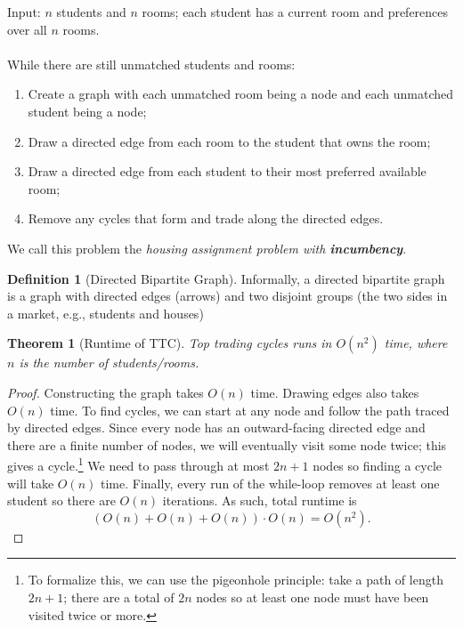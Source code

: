 \documentclass[dvipsnames]{article}
\newtheorem{theorem}{Theorem}[section]
\theoremstyle{definition}
\newtheorem{definition}{Definition}[section]
\theoremstyle{remark}
\newenvironment{mech}[1]{\begin{tcolorbox}[colback=red!5!white,colframe=red!75!black,title={#1}]}{\end{tcolorbox}}
\begin{document}
\begin{mech}{Top Trading Cycles}
	Input: $n$ students and $n$ rooms; each student has a current room and preferences over all $n$ rooms.
	\\~\\
	While there are still unmatched students and rooms: 
	\begin{enumerate}
		\item Create a graph with each unmatched room being a node and each unmatched student being a node;
		\item Draw a directed edge from each room to the student that owns the room;
		\item Draw a directed edge from each student to their most preferred available room;
		\item Remove any cycles that form and trade along the directed edges.
	\end{enumerate}
\end{mech}

We call this problem the \textit{housing assignment problem with \textbf{incumbency}}. 

\begin{definition}[Directed Bipartite Graph]
	Informally, a directed bipartite graph is a graph with directed edges (arrows) and two disjoint groups (the two sides in a market, e.g., students and houses)
\end{definition}

\begin{theorem}[Runtime of TTC]
	Top trading cycles runs in $O(n^2)$ time, where $n$ is the number of students/rooms. 
\end{theorem}

\begin{proof}
	Constructing the graph takes $O(n)$ time. Drawing edges also takes $O(n)$ time. 
	To find cycles, we can start at any node and follow the path traced by directed edges. Since every node has an outward-facing directed edge and there are a finite number of nodes, we will eventually visit some node twice; this gives a cycle.\footnote{To formalize this, we can use the pigeonhole principle: take a path of length $2n+1$; there are a total of $2n$ nodes so at least one node must have been visited twice or more.} 
	We need to pass through at most $2n+1$ nodes so finding a cycle will take $O(n)$ time. Finally, every run of the while-loop removes at least one student so there are $O(n)$ iterations. As such, total runtime is
	$$(O(n)+O(n)+O(n)) \cdot O(n) = O(n^2).$$
\end{proof}
\end{document}
